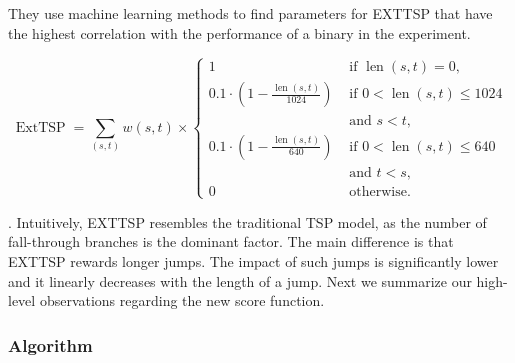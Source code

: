 They use machine learning methods to find parameters for EXTTSP
that have the highest correlation with the performance of
a binary in the experiment. 



$$
\operatorname{ExtTSP}=\sum_{(s, t)} w(s, t) \times \begin{cases}1 & \text { if } \operatorname{len}(s, t)=0, \\ 0.1 \cdot\left(1-\frac{\operatorname{len}(s, t)}{1024}\right) & \text { if } 0<\operatorname{len}(s, t) \leq 1024 \\ & \text { and } s<t, \\ 0.1 \cdot\left(1-\frac{\operatorname{len}(s, t)}{640}\right) & \text { if } 0<\operatorname{len}(s, t) \leq 640 \\ & \text { and } t<s, \\ 0 & \text { otherwise. }\end{cases}
$$

.
Intuitively, EXTTSP resembles the traditional TSP
model, as the number of fall-through branches is the dominant factor. The main difference is that EXTTSP rewards
longer jumps. The impact of such jumps is significantly
lower and it linearly decreases with the length of a jump.
Next we summarize our high-level observations regarding
the new score function.

\subsubsection{Algorithm}

